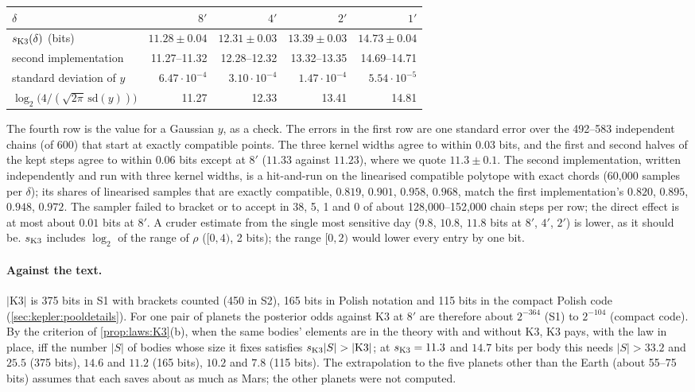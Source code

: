 \begin{center}\small
\begin{tabular}{@{}lrrrr@{}}
\toprule
$\delta$ & $8'$ & $4'$ & $2'$ & $1'$\\
\midrule
$s_{\rm K3}(\delta)$ (bits) & $11.28\pm0.04$ & $12.31\pm0.03$ & $13.39\pm0.03$ & $14.73\pm0.04$\\
second implementation & 11.27--11.32 & 12.28--12.32 & 13.32--13.35 & 14.69--14.71\\
standard deviation of $y$ & $6.47\cdot10^{-4}$ & $3.10\cdot10^{-4}$ & $1.47\cdot10^{-4}$ & $5.54\cdot10^{-5}$\\
$\log_2\big(4/(\sqrt{2\pi}\,\mathrm{sd}(y))\big)$ & 11.27 & 12.33 & 13.41 & 14.81\\
\bottomrule
\end{tabular}
\end{center}
The fourth row is the value for a Gaussian $y$, as a check. The errors in the first row are one standard error over the 492--583 independent chains (of 600) that start at exactly compatible points. The three kernel widths agree to within $0.03$ bits, and the first and second halves of the kept steps agree to within $0.06$ bits except at $8'$ ($11.33$ against $11.23$), where we quote $11.3\pm0.1$. The second implementation, written independently and run with three kernel widths, is a hit-and-run on the linearised compatible polytope with exact chords (60{,}000 samples per $\delta$); its shares of linearised samples that are exactly compatible, $0.819$, $0.901$, $0.958$, $0.968$, match the first implementation's $0.820$, $0.895$, $0.948$, $0.972$. The sampler failed to bracket or to accept in 38, 5, 1 and 0 of about 128{,}000--152{,}000 chain steps per row; the direct effect is at most about $0.01$ bits at $8'$. A cruder estimate from the single most sensitive day ($9.8$, $10.8$, $11.8$ bits at $8'$, $4'$, $2'$) is lower, as it should be. $s_{\rm K3}$ includes $\log_2$ of the range of $\rho$ ($[0,4)$, 2 bits); the range $[0,2)$ would lower every entry by one bit.

\paragraph{Against the text.} $\lvert\mathrm{K3}\rvert$ is 375 bits in S1 with brackets counted (450 in S2), 165 bits in Polish notation and 115 bits in the compact Polish code (\cref{sec:kepler:pooldetails}). For one pair of planets the posterior odds against $\mathrm{K3}$ at $8'$ are therefore about $2^{-364}$ (S1) to $2^{-104}$ (compact code). By the criterion of \cref{prop:laws:K3}(b), when the same bodies' elements are in the theory with and without $\mathrm{K3}$, $\mathrm{K3}$ pays, with the law in place, iff the number $\lvert S\rvert$ of bodies whose size it fixes satisfies $s_{\rm K3}\lvert S\rvert>\lvert\mathrm{K3}\rvert$; at $s_{\rm K3}=11.3$ and $14.7$ bits per body this needs $\lvert S\rvert>33.2$ and $25.5$ (375 bits), $14.6$ and $11.2$ (165 bits), $10.2$ and $7.8$ (115 bits). The extrapolation to the five planets other than the Earth (about 55--75 bits) assumes that each saves about as much as Mars; the other planets were not computed.

